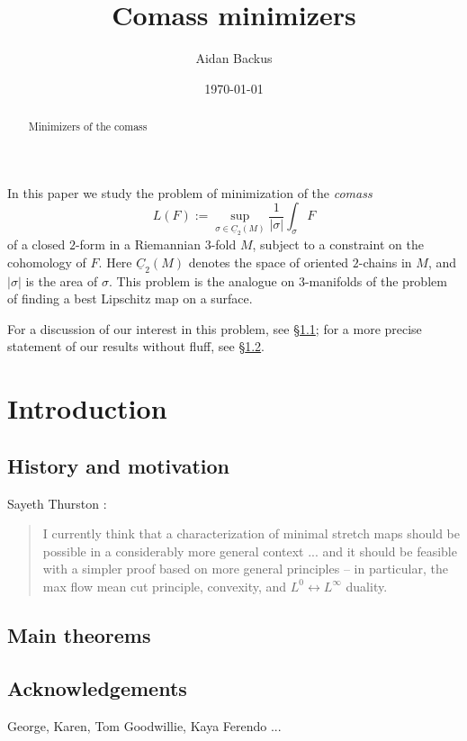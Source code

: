 \documentclass[reqno,11pt]{amsart}
\title{Comass minimizers}
\author{Aidan Backus}
\date{\today}
\newcommand{\Chain}{\underline C}
\newcommand{\dfn}[1]{\emph{#1}\index{#1}}
\theoremstyle{definition}
\numberwithin{equation}{section}
\begin{document}
\begin{abstract}
	Minimizers of the comass
\end{abstract}

\maketitle


In this paper we study the problem of minimization of the \dfn{comass}
$$L(F) := \sup_{\sigma \in \Chain_2(M)} \frac{1}{|\sigma|} \int_\sigma F$$
of a closed $2$-form in a Riemannian $3$-fold $M$, subject to a constraint on the cohomology of $F$.
Here $\Chain_2(M)$ denotes the space of oriented $2$-chains in $M$, and $|\sigma|$ is the area of $\sigma$.
This problem is the analogue on $3$-manifolds of the problem of finding a best Lipschitz map on a surface.

For a discussion of our interest in this problem, see \S\ref{motivation}; for a more precise statement of our results without fluff, see \S\ref{results}.


\section{Introduction}
\subsection{History and motivation} \label{motivation}

Sayeth Thurston \cite[Abstract]{Thurston98}:
\begin{quote}
I currently think that a characterization of minimal stretch maps should be possible in a considerably more general context ... and it should be feasible with a simpler proof based on more general principles -- in particular, the max flow mean cut principle, convexity, and $L^0 \leftrightarrow L^\infty$ duality.
\end{quote}

\subsection{Main theorems} \label{results}

\subsection{Acknowledgements}
George, Karen, Tom Goodwillie, Kaya Ferendo ...
\end{document}
